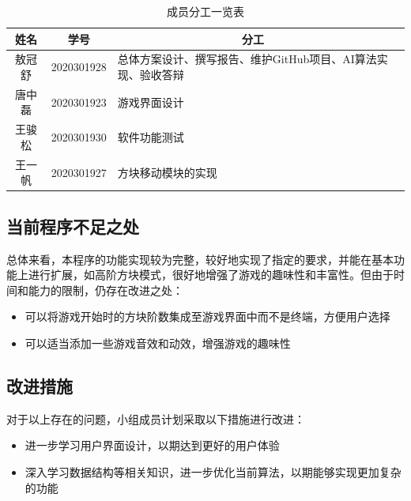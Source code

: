 \documentclass[UTF8,AutoFakeBold,AutoFakeSlant,zihao=-4]{ctexart}
\begin{document}
\begin{table}[!ht]
  \centering
  \caption{成员分工一览表}
  \label{tab:progress}
  \begin{tabular}{@{}cllc@{}}
    \toprule
    姓名 & \multicolumn{1}{c}{学号} & \multicolumn{1}{c}{分工}    \\ \midrule
    敖冠舒 & 2020301928          & 总体方案设计、撰写报告、维护GitHub项目、AI算法实现、验收答辩     \\
    唐中磊 & 2020301923          & 游戏界面设计                   \\
    王骏松 & 2020301930          & 软件功能测试  \\ 
    王一帆 & 2020301927          & 方块移动模块的实现              \\ \bottomrule
  \end{tabular}
\end{table}

\subsection{当前程序不足之处}
总体来看，本程序的功能实现较为完整，较好地实现了指定的要求，并能在基本功能上进行扩展，如高阶方块模式，很好地增强了游戏的趣味性和丰富性。但由于时间和能力的限制，仍存在改进之处：

\begin{itemize}
  \item 可以将游戏开始时的方块阶数集成至游戏界面中而不是终端，方便用户选择
  \item 可以适当添加一些游戏音效和动效，增强游戏的趣味性
\end{itemize}

\subsection{改进措施}
对于以上存在的问题，小组成员计划采取以下措施进行改进：
\begin{itemize}
  \item 进一步学习用户界面设计，以期达到更好的用户体验
  \item 深入学习数据结构等相关知识，进一步优化当前算法，以期能够实现更加复杂的功能
\end{itemize}
\end{document}
